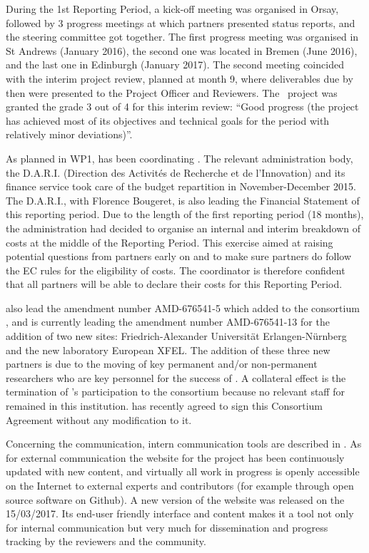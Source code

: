 \documentclass{deliverablereport}
\begin{document}
During the 1st Reporting Period, a kick-off meeting was organised in Orsay, followed by
3 progress meetings at which partners presented status reports, and
the steering committee got together.  The first progress meeting was
organised in St Andrews (January 2016), the second one was located
in Bremen (June 2016), and the last one in Edinburgh (January 2017). The second meeting coincided with the interim project
review, planned at month 9, where deliverables due by then were
presented to the Project Officer and Reviewers. The \ODK\ project was
granted the grade 3 out of 4 for this interim review: ``Good progress
(the project has achieved most of its objectives and technical goals
for the period with relatively minor deviations)''.

As planned in WP1,  has been coordinating \ODK.  The  relevant administration body, the D.A.R.I. (Direction des Activités de Recherche et de l'Innovation) and its finance service took care of the budget repartition in November-December 2015. The D.A.R.I., with Florence Bougeret, is also leading the Financial Statement of this reporting period. Due to the length of the first reporting period (18 months), the  administration had decided to organise an internal and interim
breakdown of costs at the middle of the Reporting Period. This exercise aimed at raising potential questions
from partners early on and to make sure partners do follow the EC
rules for the eligibility of costs. The coordinator is therefore confident that all partners will be able to declare their costs for this Reporting Period.

 also lead the amendment number AMD-676541-5 which added to the consortium , and is currently leading the amendment number AMD-676541-13 for the addition of two new sites: Friedrich-Alexander Universität Erlangen-Nürnberg and the new laboratory European XFEL. The addition of these three new partners is due to the moving of key permanent and/or non-permanent researchers who are key personnel for the success of \ODK. A collateral effect is the termination of 's participation to the consortium because no relevant staff for \ODK remained in this institution.
 has recently agreed to sign this Consortium Agreement
without any modification to it.


Concerning the communication, intern communication tools are described
in . As for external
communication the website for the project has been continuously
updated with new content, and virtually all work in progress is openly
accessible on the Internet to external experts and contributors (for
example through open source software on Github). A new version of the
website was released on the 15/03/2017. Its end-user friendly
interface and content makes it a tool not only for internal
communication but very much for dissemination and progress tracking by
the reviewers and the community.
\end{document}
